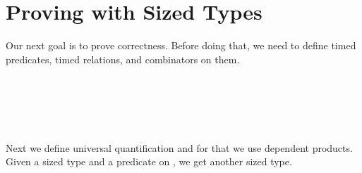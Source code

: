 \section{Proving with Sized Types}
Our next goal is to prove correctness.
Before doing that, we need to define timed predicates, timed relations, and combinators on them.

\begin{code}%
\>[0]\AgdaSpace{}%
\AgdaSymbol{:}\AgdaSpace{}%
\AgdaSpace{}%
\AgdaSpace{}%
\<%
\\
\>[0]\AgdaSpace{}%
\AgdaSpace{}%
\AgdaSymbol{=}\AgdaSpace{}%
\AgdaSymbol{\{}\AgdaSpace{}%
\AgdaSymbol{:}\AgdaSpace{}%
\AgdaSymbol{\}}\AgdaSpace{}%
\AgdaSpace{}%
\AgdaSpace{}%
\AgdaSpace{}%
\AgdaSpace{}%
\<%
\\
%
\\[\AgdaEmptyExtraSkip]%
\>[0]\AgdaSpace{}%
\AgdaSymbol{:}\AgdaSpace{}%
\AgdaSpace{}%
\AgdaSpace{}%
\AgdaSpace{}%
\AgdaSpace{}%
\<%
\\
\>[0]\AgdaSpace{}%
\AgdaSpace{}%
\AgdaSpace{}%
\AgdaSymbol{=}\AgdaSpace{}%
\AgdaSymbol{\{}\AgdaSpace{}%
\AgdaSymbol{:}\AgdaSpace{}%
\AgdaSymbol{\}}\AgdaSpace{}%
\AgdaSpace{}%
\AgdaSpace{}%
\AgdaSpace{}%
\AgdaSpace{}%
\AgdaSpace{}%
\AgdaSpace{}%
\AgdaSpace{}%
\<%
\end{code}

Next we define universal quantification and for that we use dependent products.
Given a sized type  and a predicate on , we get another sized type.

\begin{code}%
\>[0]\AgdaSpace{}%
\AgdaSymbol{:}\AgdaSpace{}%
\AgdaSymbol{(}\AgdaSpace{}%
\AgdaSymbol{:}\AgdaSpace{}%
\AgdaSymbol{)}\AgdaSpace{}%
\AgdaSpace{}%
\AgdaSpace{}%
\AgdaSpace{}%
\AgdaSpace{}%
\<%
\\
\>[0]\AgdaSpace{}%
\AgdaSpace{}%
\AgdaSpace{}%
\AgdaSpace{}%
\AgdaSymbol{=}\AgdaSpace{}%
\AgdaSymbol{(}\AgdaSpace{}%
\AgdaSymbol{:}\AgdaSpace{}%
\AgdaSpace{}%
\AgdaSymbol{)}\AgdaSpace{}%
\AgdaSpace{}%
\AgdaSpace{}%
\<%
\end{code}

